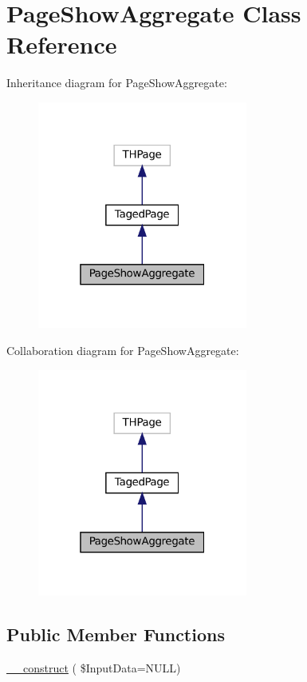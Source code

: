 \hypertarget{class_page_show_aggregate}{}\section{Page\+Show\+Aggregate Class Reference}
\label{class_page_show_aggregate}


Inheritance diagram for Page\+Show\+Aggregate\+:\nopagebreak
\begin{figure}[H]
\begin{center}
\leavevmode
\includegraphics[width=196pt]{class_page_show_aggregate__inherit__graph}
\end{center}
\end{figure}


Collaboration diagram for Page\+Show\+Aggregate\+:\nopagebreak
\begin{figure}[H]
\begin{center}
\leavevmode
\includegraphics[width=196pt]{class_page_show_aggregate__coll__graph}
\end{center}
\end{figure}
\subsection*{Public Member Functions}
\begin{DoxyCompactItemize}
\item 
\hyperlink{class_page_show_aggregate_a3e1094f868d001337de44b7d7feeb51f}{\+\_\+\+\_\+construct} ( \$Input\+Data=N\+U\+LL)
\end{DoxyCompactItemize}
